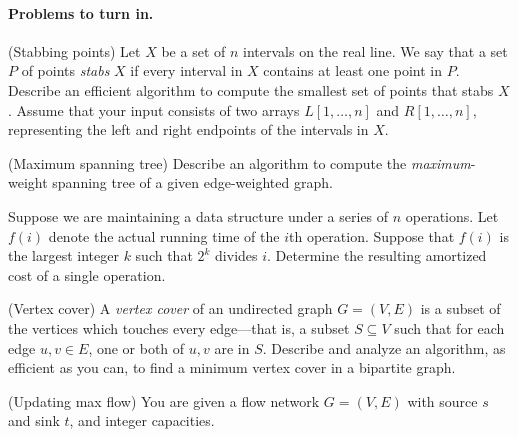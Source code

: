 \paragraph{Problems to turn in.}

\begin{questions}
  \question[10] (Stabbing points) Let $X$ be a set of $n$ intervals on
  the real line. We say that a set $P$ of points \emph{stabs} $X$ if
  every interval in $X$ contains at least one point in $P$. Describe
  an efficient algorithm to compute the smallest set of points that
  stabs $X$. Assume that your input consists of two arrays
  $L[1,\ldots,n]$ and $R[1,\ldots,n]$, representing the left and right
  endpoints of the intervals in $X$.

  \newpage

  \question[10] (Maximum spanning tree) Describe an algorithm to
  compute the \emph{maximum}-weight spanning tree of a given
  edge-weighted graph.

  \newpage

  \question[10] Suppose we are maintaining a data structure under a
  series of $n$ operations. Let $f(i)$ denote the actual running time
  of the $i$th operation. Suppose that $f(i)$ is the largest integer
  $k$ such that $2^k$ divides $i$. Determine the resulting amortized
  cost of a single operation.
  
\newpage 
\question[15] (Vertex cover) A \emph{vertex cover} of an undirected
  graph $G = (V, E)$ is a subset of the vertices which touches every
  edge—that is, a subset $S \subseteq V$ such that for each edge
  ${u,v} \in E$, one or both of $u,v$ are in $S$.  Describe and
  analyze an algorithm, as efficient as you can, to find a minimum
  vertex cover in a bipartite graph.

  \newpage

  \question (Updating max flow) You are given a flow network
  $G = (V,E)$ with source $s$ and sink $t$, and integer capacities.
\end{questions}




